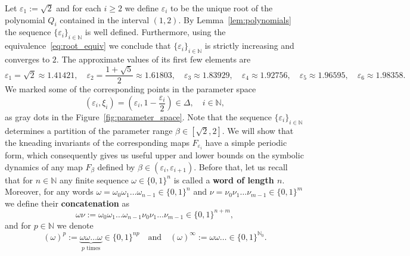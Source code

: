 \documentclass[10pt,reqno]{amsart}
\theoremstyle{plain}
\theoremstyle{assumption}
\theoremstyle{notation}
\theoremstyle{claim}
\theoremstyle{conj}
\theoremstyle{theorem}
\theoremstyle{proposition}
\theoremstyle{corollary}
\begin{document}
Let $\varepsilon_1:=\sqrt{2}$ and for each $i\geq2$ we define $\varepsilon_i$ to be the unique root of the polynomial $Q_i$ contained in the interval $(1,2)$. By Lemma~\ref{lem:polynomials} the sequence $\{\varepsilon_i\}_{i\in\mathbb{N}}$ is well defined. Furthermore, using the equivalence~\eqref{eq:root_equiv} we conclude that $\{\varepsilon_i\}_{i\in\mathbb{N}}$ is strictly increasing and converges to $2$. The approximate values of its first few elements are
$$
\varepsilon_1=\sqrt{2}\approx 1.41421,\quad\varepsilon_2=\frac{1+\sqrt{5}}{2}\approx1.61803,\quad\varepsilon_3\approx1.83929,\quad\varepsilon_4\approx1.92756,\quad\varepsilon_5\approx1.96595,\quad\varepsilon_6\approx1.98358.
$$
We marked some of the corresponding points in the parameter space
\begin{equation}
    \label{eq:parameter_points_eps}
    (\varepsilon_i,\xi_i)=\left(\varepsilon_i,1-\frac{\varepsilon_i}{2}\right)\in\Delta,\quad i\in\mathbb{N},
\end{equation}
as gray dots in the Figure~\ref{fig:parameter_space}. Note that the sequence $\{\varepsilon_i\}_{i\in\mathbb{N}}$ determines a partition of the parameter range $\beta\in[\sqrt{2},2]$. We will show that the kneading invariants of the corresponding maps $F_{\varepsilon_i}$ have a simple periodic form, which consequently gives us useful upper and lower bounds on the symbolic dynamics of any map $F_{\beta}$ defined by $\beta\in(\varepsilon_i,\varepsilon_{i+1})$. Before that, let us recall that for $n\in\mathbb{N}$ any finite sequence $\omega\in\{0,1\}^n$ is called a \textbf{word of length $n$}. Moreover, for any words $\omega=\omega_0\omega_1\ldots\omega_{n-1}\in\{0,1\}^n$ and $\nu=\nu_0\nu_1\ldots\nu_{m-1}\in\{0,1\}^m$ we define their \textbf{concatenation} as
$$
\omega\nu:=\omega_0\omega_1\ldots\omega_{n-1}\nu_0\nu_1\ldots\nu_{m-1}\in\{0,1\}^{n+m},
$$
and for $p\in\mathbb{N}$ we denote
$$
(\omega)^p:=\underbrace{\omega\omega\ldots\omega}_\text{$p$ times}\in\{0,1\}^{np}\quad\text{and}\quad(\omega)^\infty:=\omega\omega\ldots\in\{0,1\}^{\mathbb{N}_0}.
$$
\end{document}
